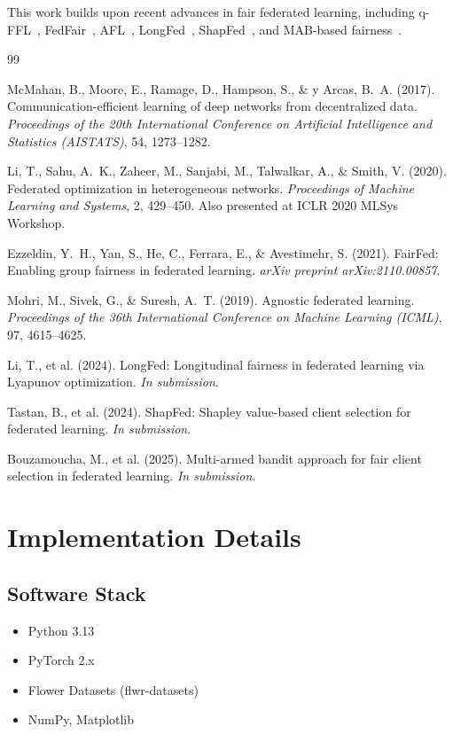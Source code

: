 \documentclass{article}
\begin{document}
This work builds upon recent advances in fair federated learning, including q-FFL~\cite{li2020qffl}, FedFair~\cite{ezzeldin2021fedfair}, AFL~\cite{mohri2019afl}, LongFed~\cite{li2024longfed}, ShapFed~\cite{tastan2024shapfed}, and MAB-based fairness~\cite{bouzamoucha2025mab}.

\begin{thebibliography}{99}

McMahan, B., Moore, E., Ramage, D., Hampson, S., \& y Arcas, B.~A. (2017).
Communication-efficient learning of deep networks from decentralized data.
\textit{Proceedings of the 20th International Conference on Artificial Intelligence and Statistics (AISTATS)}, 54, 1273--1282.

Li, T., Sahu, A.~K., Zaheer, M., Sanjabi, M., Talwalkar, A., \& Smith, V. (2020).
Federated optimization in heterogeneous networks.
\textit{Proceedings of Machine Learning and Systems}, 2, 429--450.
Also presented at ICLR 2020 MLSys Workshop.

Ezzeldin, Y.~H., Yan, S., He, C., Ferrara, E., \& Avestimehr, S. (2021).
FairFed: Enabling group fairness in federated learning.
\textit{arXiv preprint arXiv:2110.00857}.

Mohri, M., Sivek, G., \& Suresh, A.~T. (2019).
Agnostic federated learning.
\textit{Proceedings of the 36th International Conference on Machine Learning (ICML)}, 97, 4615--4625.

Li, T., et al. (2024).
LongFed: Longitudinal fairness in federated learning via Lyapunov optimization.
\textit{In submission}.

Tastan, B., et al. (2024).
ShapFed: Shapley value-based client selection for federated learning.
\textit{In submission}.

Bouzamoucha, M., et al. (2025).
Multi-armed bandit approach for fair client selection in federated learning.
\textit{In submission}.

\end{thebibliography}

\appendix

\section{Implementation Details}

\subsection{Software Stack}
\begin{itemize}
    \item Python 3.13
    \item PyTorch 2.x
    \item Flower Datasets (flwr-datasets)
    \item NumPy, Matplotlib
\end{itemize}
\end{document}
